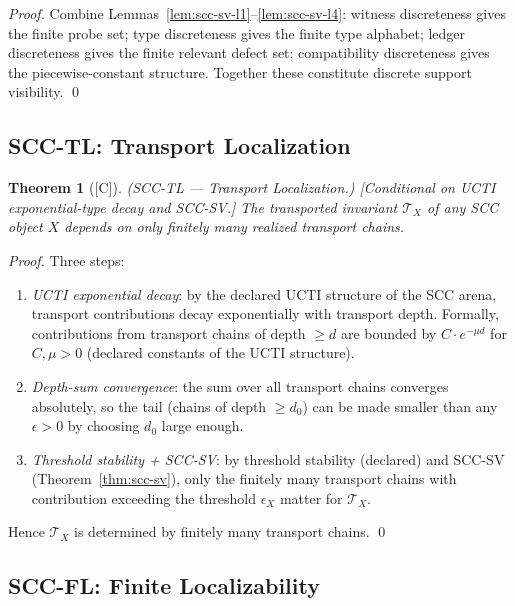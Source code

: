 \documentclass[12pt,oneside]{amsbook}
\theoremstyle{plain}
\newtheorem{theorem}{Theorem}[section]
\theoremstyle{definition}
\theoremstyle{remark}
\newcommand{\status}[1]{\textup{[#1]}}
\begin{document}
\begin{proof}
Combine Lemmas~\ref{lem:scc-sv-l1}--\ref{lem:scc-sv-l4}: witness
discreteness gives the finite probe set; type discreteness gives
the finite type alphabet; ledger discreteness gives the finite
relevant defect set; compatibility discreteness gives the
piecewise-constant structure. Together these constitute discrete
support visibility. \qed
\end{proof}

\subsection{SCC-TL: Transport Localization}

\begin{theorem}[\status{C}]\label{thm:scc-tl}
\textup{(SCC-TL --- Transport Localization.)}
\textup{[Conditional on UCTI exponential-type decay and
SCC-SV.]}
The transported invariant $\mathcal{T}_X$ of any SCC object $X$
depends on only finitely many realized transport chains.
\end{theorem}

\begin{proof}
Three steps:
\begin{enumerate}[label=\textup{(\arabic*)}]
 \item \emph{UCTI exponential decay}: by the declared UCTI
 structure of the SCC arena, transport contributions decay
 exponentially with transport depth. Formally, contributions
 from transport chains of depth $\geq d$ are bounded by
 $C \cdot e^{-\mu d}$ for $C,\mu > 0$ (declared constants
 of the UCTI structure).
 \item \emph{Depth-sum convergence}: the sum over all transport
 chains converges absolutely, so the tail (chains of depth
 $\geq d_0$) can be made smaller than any $\epsilon > 0$ by
 choosing $d_0$ large enough.
 \item \emph{Threshold stability + SCC-SV}: by threshold
 stability (declared) and SCC-SV (Theorem~\ref{thm:scc-sv}),
 only the finitely many transport chains with contribution
 exceeding the threshold $\epsilon_X$ matter for
 $\mathcal{T}_X$.
\end{enumerate}
Hence $\mathcal{T}_X$ is determined by finitely many transport
chains. \qed
\end{proof}

\subsection{SCC-FL: Finite Localizability}
\end{document}
